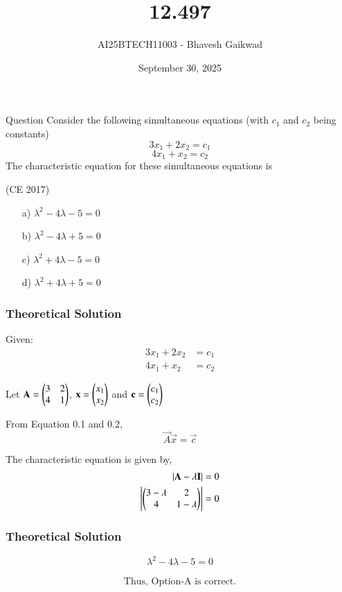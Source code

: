 \documentclass{beamer}
\title
{12.497}
\date{September 30, 2025}
\author 
{AI25BTECH11003 - Bhavesh Gaikwad}
\begin{document}
\frame{\titlepage}
\begin{frame}{Question}
Consider the following simultaneous equations (with $c_1$ and $c_2$ being constants)
$$3x_1 + 2x_2 = c_1$$
$$4x_1 + x_2 = c_2$$
The characteristic equation for these simultaneous equations is

\hfill{(CE 2017)}
\begin{itemize}
    \item[a)]$\lambda^2 - 4\lambda - 5 =0$
    \item[b)] $\lambda^2 - 4\lambda + 5 =0$
    \item[c)]$\lambda^2 + 4\lambda - 5 =0$
    \item[d)]$\lambda^2 + 4\lambda + 5 =0$
\end{itemize}
\end{frame}


\begin{frame}[fragile]
    \frametitle{Theoretical Solution}
Given:
\begin{align}
   3x_1 + 2x_2 &= c_1\\
4x_1 + x_2 &= c_2 
\end{align}

Let $\mathbf{A} = \begin{pmatrix}3 & 2 \\ 4 & 1\end{pmatrix}$, $\mathbf{x} = \begin{pmatrix}x_1 \\ x_2\end{pmatrix}$
and $\mathbf{c} = \begin{pmatrix}c_1 \\ c_2\end{pmatrix}$

From Equation 0.1 and 0.2,
\begin{equation}
    \vec{A}\vec{x} = \vec{c}
\end{equation}

The characteristic equation is given by,
\begin{align}
|\mathbf{A} - \lambda\mathbf{I}| &= 0 \\
\left| \begin{pmatrix}3-\lambda & 2 \\ 4 & 1-\lambda\end{pmatrix} \right| &= 0 \\
\end{align}
\end{frame}

\begin{frame}[fragile]
    \frametitle{Theoretical Solution}
\begin{equation}
    \boxed{\lambda^2 - 4\lambda - 5 =0}
\end{equation}

\begin{align*}
    \boxed{\text{Thus, Option-A is correct.}}
\end{align*}
\end{frame}
\end{document}
